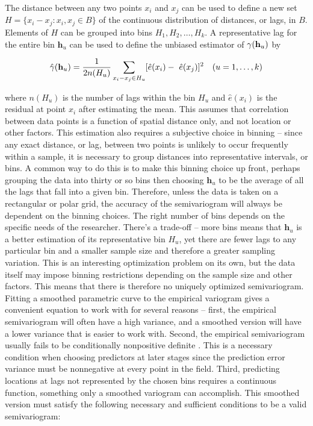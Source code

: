 \documentclass[12pt,twoside]{reedthesis}
\begin{document}
The distance between any two points $x_i$ and $x_j$ can be used to define a new set $H = \{ x_i - x_j: x_i, x_j \in B \}$ of the continuous distribution of distances, or lags, in $B$. Elements of $H$ can be grouped into bins $H_1, H_2, \dots, H_k$. A representative lag for the entire bin $\mathbf{h}_u$ can be used to define the unbiased estimator of $\gamma(\bold{h}_u)$ by

\begin{align*} 
   \hat\gamma(\bold{h}_u) = { 1 \over {2n(H_u)}} \sum_{x_i - x_j \in H_u} [ \hat e(x_i) - \
   \hat e(x_j) ] ^2 \quad (u = 1, \dots, k)
\end{align*}

\noindent where $n(H_u)$ is the number of lags within the bin $H_u$ and $\hat e(x_i)$ is the residual at point $x_i$ after estimating the mean. This assumes that correlation between data points is a function of spatial distance only, and not location or other factors. This estimation also requires a subjective choice in binning -- since any exact distance, or lag, between two points is unlikely to occur frequently within a sample, it is necessary to group distances into representative intervals, or bins. A common way to do this is to make this binning choice up front, perhaps grouping the data into thirty or so bins then choosing $\mathbf{h}_u$ to be the average of all the lags that fall into a given bin. Therefore, unless the data is taken on a rectangular or polar grid, the accuracy of the semivariogram will always be dependent on the binning choices. The right number of bins depends on the specific needs of the researcher. There's a trade-off -- more bins means that $\mathbf{h}_u$ is a better estimation of its representative bin $H_u$, yet there are fewer lags to any particular bin and a smaller sample size and therefore a greater sampling variation. This is an interesting optimization problem on its own, but the data itself may impose binning restrictions depending on the sample size and other factors. This means that there is therefore no uniquely optimized semivariogram. \\

Fitting a smoothed parametric curve to the empirical variogram gives a convenient equation to work with for several reasons -- first, the empirical semivariogram will often have a high variance, and a smoothed version will have a lower variance that is easier to work with. Second, the empirical semivariogram usually fails to be conditionally nonpositive definite \cite{gelfand:2010}. This is a necessary condition when choosing predictors at later stages since the prediction error variance must be nonnegative at every point in the field. Third, predicting locations at lags not represented by the chosen bins requires a continuous function, something only a smoothed variogram can accomplish. This smoothed version must satisfy the following necessary and sufficient conditions to be a valid semivariogram: \\
\end{document}
